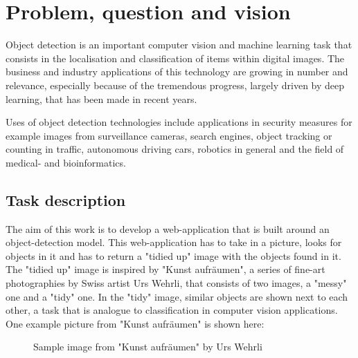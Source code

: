 \chapter{Problem, question and vision}
\label{ch:problem}
Object detection is an important computer vision and machine learning task that consists in the localisation and classification of items within digital images. The business and industry applications of this technology are growing in number and relevance, especially because of the tremendous progress, largely driven by deep learning, that has been made in recent years.

Uses of object detection technologies include applications in security measures for example images from surveillance cameras, search engines, object tracking or counting in traffic, autonomous driving cars, robotics in general and the field of medical- and bioinformatics.

\section{Task description}
The aim of this work is to develop a web-application that is built around an object-detection model. This web-application has to take in a picture, looks for objects in it and has to return a "tidied up" image with the objects found in it. The "tidied up" image is inspired by "Kunst aufräumen", a series of fine-art photographies by Swiss artist Urs Wehrli, that consists of two images, a "messy" one and a "tidy" one. In the "tidy" image, similar objects are shown next to each other, a task that is analogue to classification in computer vision applications. One example picture from "Kunst aufräumen" is shown here:

\begin{figure}[H]
	\caption{\label{fig:kunst-aufraeumen-sample} Sample image from "Kunst aufräumen" by Urs Wehrli}
\end{figure}

